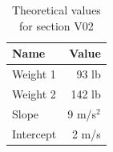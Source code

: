 \begin{table}[ht]
    \centering
    \begin{tabular}{|l|r|}
        \hline
        \textbf{Name} & \textbf{Value} \\
        \hline
        Weight 1 & 93 lb \\
        Weight 2 & 142 lb \\
        \hline
        Slope & 9 m/s$^{2}$ \\
        Intercept & 2 m/s \\
        \hline
    \end{tabular}
    \caption{Theoretical values for section V02}
    \label{table:00.theoretical.v02}
\end{table}
\newpage
